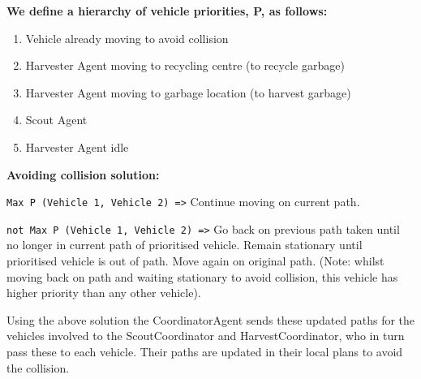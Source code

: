 \textbf{We define a hierarchy of vehicle priorities, P, as follows:}

\begin{enumerate}
	\item Vehicle already moving to avoid collision
	\item Harvester Agent moving to recycling centre (to recycle garbage)
	\item Harvester Agent moving to garbage location (to harvest garbage)
	\item Scout Agent 
	\item Harvester Agent idle 
\end{enumerate}

\textbf{Avoiding collision solution:}


\texttt{Max P (Vehicle 1, Vehicle 2) =>} Continue moving on current path.

\texttt{not Max P (Vehicle 1, Vehicle 2) =>} Go back on previous path taken until no longer in current path of prioritised vehicle. Remain stationary until prioritised vehicle is out of path. Move again on original path. (Note: whilst moving back on path and waiting stationary to avoid collision, this vehicle has higher priority than any other vehicle).

Using the above solution the CoordinatorAgent sends these updated paths for the vehicles involved to the ScoutCoordinator and HarvestCoordinator, who in turn pass these to each vehicle. Their paths are updated in their local plans to avoid the collision.  







